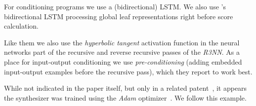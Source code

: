\documentclass{article}
\begin{document}





For conditioning programs we use a (bidirectional) LSTM.
We also use \citet{nsps}'s bidirectional LSTM processing global leaf representations right before score calculation.

Like them we also use the \emph{hyperbolic tangent} activation function in the neural networks part of the recursive and reverse recursive passes of the \emph{R3NN}.
As a place for input-output conditioning we use \emph{pre-conditioning}
(adding embedded input-output examples before the recursive pass),
which they report to work best.

While not indicated in the paper itself,
but only in a related patent~\citep{mohamed2017neural},
it appears the synthesizer was trained using the \emph{Adam} optimizer~\citep{kingma2014adam}.
We follow this example.
\end{document}
